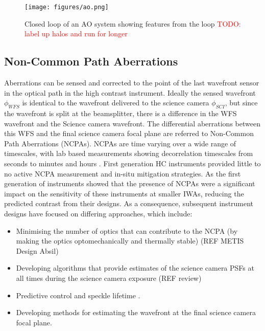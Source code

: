 \documentclass[letterpaper]{ar-1col}
\begin{document}
\begin{figure}[ht]
  \centering
  \texttt{[image: figures/ao.png]}
  \caption{Closed loop of an AO system showing features from the loop \textcolor{red}{TODO: label up halos and run for longer}}
  \label{fig:ao}
\end{figure}

\subsection{Non-Common Path Aberrations}

Aberrations can be sensed and corrected to the point of the last wavefront sensor in the optical path in the high contrast instrument.
%
Ideally the sensed wavefront $\phi_{WFS}$ is identical to the wavefront delivered to the science camera $\phi_{SCI}$, but since the wavefront is split at the beamsplitter, there is a difference in the WFS wavefront and the Science camera wavefront.
%
The differential aberrations between this WFS and the final science camera focal plane are referred to Non-Common Path Aberrations (NCPAs).
%
NCPAs are time varying over a wide range of timescales, with lab based measurements showing decorrelation timescales from seconds to minutes and hours \citep{Martinez12,Males21}.
%
First generation HC instruments provided little to no active NCPA measurement and in-situ mitigation strategies.
%
As the first generation of instruments showed that the presence of NCPAs were a significant impact on the sensitivity of these instruments at smaller IWAs, reducing the predicted contrast from their designs.
%
As a consequence, subsequent instrument designs have focused on differing  approaches, which include:

\begin{itemize}
    \item Minimising the number of optics that can contribute to the NCPA (by making the optics optomechanically and thermally stable) (REF METIS Design Absil)
    \item Developing algorithms that provide estimates of the science camera PSFs at all times during the science camera exposure (REF review)
    \item Predictive control and speckle lifetime \citep{Males18}.
    \item Developing methods for estimating the wavefront at the final science camera focal plane.
\end{itemize}
\end{document}
